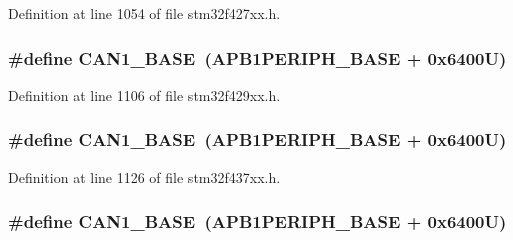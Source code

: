 Definition at line 1054 of file stm32f427xx.\+h.

\subsubsection[{\texorpdfstring{C\+A\+N1\+\_\+\+B\+A\+SE}{CAN1_BASE}}]{\setlength{\rightskip}{0pt plus 5cm}\#define C\+A\+N1\+\_\+\+B\+A\+SE~({\bf A\+P\+B1\+P\+E\+R\+I\+P\+H\+\_\+\+B\+A\+SE} + 0x6400\+U)}\hypertarget{group___peripheral__memory__map_gad8e45ea6c032d9fce1b0516fff9d8eaa}{}\label{group___peripheral__memory__map_gad8e45ea6c032d9fce1b0516fff9d8eaa}


Definition at line 1106 of file stm32f429xx.\+h.

\subsubsection[{\texorpdfstring{C\+A\+N1\+\_\+\+B\+A\+SE}{CAN1_BASE}}]{\setlength{\rightskip}{0pt plus 5cm}\#define C\+A\+N1\+\_\+\+B\+A\+SE~({\bf A\+P\+B1\+P\+E\+R\+I\+P\+H\+\_\+\+B\+A\+SE} + 0x6400\+U)}\hypertarget{group___peripheral__memory__map_gad8e45ea6c032d9fce1b0516fff9d8eaa}{}\label{group___peripheral__memory__map_gad8e45ea6c032d9fce1b0516fff9d8eaa}


Definition at line 1126 of file stm32f437xx.\+h.

\subsubsection[{\texorpdfstring{C\+A\+N1\+\_\+\+B\+A\+SE}{CAN1_BASE}}]{\setlength{\rightskip}{0pt plus 5cm}\#define C\+A\+N1\+\_\+\+B\+A\+SE~({\bf A\+P\+B1\+P\+E\+R\+I\+P\+H\+\_\+\+B\+A\+SE} + 0x6400\+U)}\hypertarget{group___peripheral__memory__map_gad8e45ea6c032d9fce1b0516fff9d8eaa}{}\label{group___peripheral__memory__map_gad8e45ea6c032d9fce1b0516fff9d8eaa}


